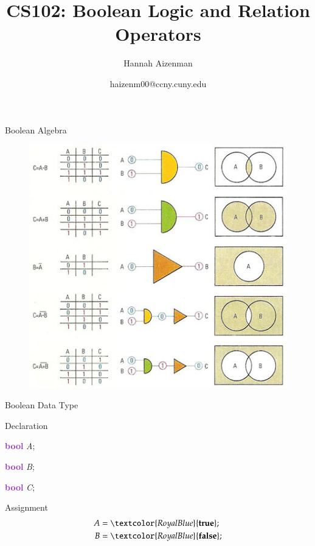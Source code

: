 \documentclass[xcolor={dvipsnames}]{beamer}
\begin{document}
\title{ CS102: Boolean Logic and Relation Operators }
\author{Hannah Aizenman}
\date{haizenm00@ccny.cuny.edu}


\begin{frame}
	\titlepage
\end{frame}


\begin{frame}{Boolean Algebra}
	\begin{figure}
		\href{http://www.daviddarling.info/encyclopedia/B/Boolean_algebra.html}{\includegraphics[width=.75\textwidth]{Boolean_algebra}}
	\end{figure}
\end{frame}



\begin{frame}{Boolean Data Type}
\begin{block}{Declaration}
	\begin{center}
		\item \textcolor{DarkOrchid}{\textbf{bool}} \textit{A};\\
		\item \textcolor{DarkOrchid}{\textbf{bool}} \textit{B};
		\item \textcolor{DarkOrchid}{\textbf{bool}} \textit{C};
	\end{center}
\end{block}
\pause
\begin{block}{Assignment}
	\begin{align*}
		A &= \textcolor{RoyalBlue}{\textbf{true}};\\
		B &= \textcolor{RoyalBlue}{\textbf{false}};
	\end{align*}
\end{block}
\end{frame}
\end{document}
